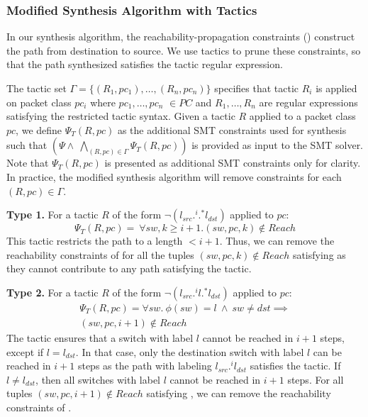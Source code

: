 \subsubsection{Modified Synthesis Algorithm with Tactics}
In our synthesis algorithm, the reachability-propagation constraints () 
construct the path from destination to source. We use tactics to prune these constraints, so that
the path synthesized satisfies the tactic regular expression.  

The tactic set $\Gamma = \{(R_1, pc_1), \ldots, (R_n, pc_n)\}$
specifies that tactic $R_i$ is applied on packet class $pc_i$ where 
$pc_1, \ldots, pc_n$ $\in PC$ and $R_1,\ldots,R_n$ are regular
expressions satisfying the restricted tactic syntax. 
Given a tactic $R$ applied to a packet class $pc$, 
we define $\Psi_T(R,pc)$ as the additional SMT constraints used for 
synthesis such that  $(\Psi \wedge\ \bigwedge\limits_{(R, pc) \in \Gamma} \Psi_T(R,pc))$ 
is provided as input to the SMT solver.
	Note that $\Psi_T(R,pc)$ is presented as additional SMT 
constraints only for clarity. 
In practice, the modified synthesis algorithm will remove constraints for each 
$(R,pc)\in \Gamma$.

\noindent\textbf{Type 1.} For a tactic $R$ of the form $\neg (l_{src} .^i .^* l_{dst})$ applied to $pc$: 
\begin{equation} \label{eq:type1}
	\Psi_T(R, pc) = ~ \forall sw,k \geq i + 1. (sw,pc,k) \notin Reach
\end{equation}
This tactic restricts the path to a length $ < i + 1$. Thus, we can remove the reachability constraints  of  
for all the tuples $(sw,pc,k) \notin Reach$ satisfying 
as they cannot contribute to any path satisfying the tactic.  

\noindent\textbf{Type 2.} For a tactic $R$  
of the form $\neg (l_{src}  .^i l .^* l_{dst})$ applied to $pc$:
\begin{multline} \label{eq:t1}
\Psi_T(R,pc) = \forall sw.~ \phi(sw) = l ~\wedge~ sw \not= dst \implies \\ 
(sw, pc, i + 1) \notin Reach
\end{multline}
The tactic ensures that a switch with label $l$ cannot be reached in $i+1$
steps, except if $l = l_{dst}$. In that case,
only the destination switch with label $l$ can be reached in $i+1$ steps as 
the path with labeling $l_{src}.^i l_{dst}$ satisfies the tactic. If $l \not= l_{dst}$, then
all switches with label $l$ cannot be reached in $i+1$ steps. For all tuples
$(sw, pc, i+1) \notin Reach$ satisfying , we can remove the reachability constraints of .


